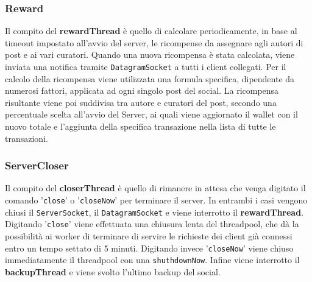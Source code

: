 \documentclass[11pt, a4paper, oneside]{article}
\begin{document}
\subsubsection{Reward}
Il compito del \textbf{rewardThread} è quello di calcolare periodicamente, in base al timeout impostato all'avvio del server, le ricompense da assegnare agli autori 
di post e ai vari curatori. Quando una nuova ricompensa è stata calcolata, viene inviata una notifica tramite \texttt{DatagramSocket} a tutti i client collegati.  
Per il calcolo della ricompensa viene utilizzata una formula specifica, dipendente da numerosi fattori, applicata ad ogni singolo post del social. La ricompensa
risultante viene poi suddivisa tra autore e curatori del post, secondo una percentuale scelta all'avvio del Server, ai quali viene aggiornato il wallet con il nuovo 
totale e l'aggiunta della specifica transazione nella lista di tutte le transazioni.
\subsubsection{ServerCloser}
Il compito del \textbf{closerThread} è quello di rimanere in attesa che venga digitato il comando '\texttt{close}' o '\texttt{closeNow}' per terminare il server.
In entrambi i casi vengono chiusi il \texttt{ServerSocket}, il \texttt{DatagramSocket} e viene interrotto il \textbf{rewardThread}.
Digitando '\texttt{close}' viene effettuata una chiusura lenta del threadpool, che dà la possibilità ai worker di terminare di servire le richieste dei client già connessi entro 
un tempo settato di 5 minuti. Digitando invece '\texttt{closeNow}' viene chiuso immediatamente il threadpool con una \texttt{shuthdownNow}. Infine viene interrotto 
il \textbf{backupThread} e viene svolto l'ultimo backup del social.
\end{document}
